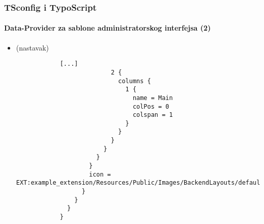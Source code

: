 \begin{frame}[fragile]
	\frametitle{TSconfig i TypoScript}
	\framesubtitle{Data-Provider za sablone administratorskog interfejsa (2)}

	\lstset{basicstyle=\tiny\ttfamily}

	\begin{itemize}
		\item \smaller(nastavak)\normalsize
		\begin{lstlisting}
			[...]
			              2 {
			                columns {
			                  1 {
			                    name = Main
			                    colPos = 0
			                    colspan = 1
			                  }
			                }
			              }
			            }
			          }
			        }
			        icon = EXT:example_extension/Resources/Public/Images/BackendLayouts/default.gif
			      }
			    }
			  }
			}
		\end{lstlisting}
	\end{itemize}

\end{frame}


